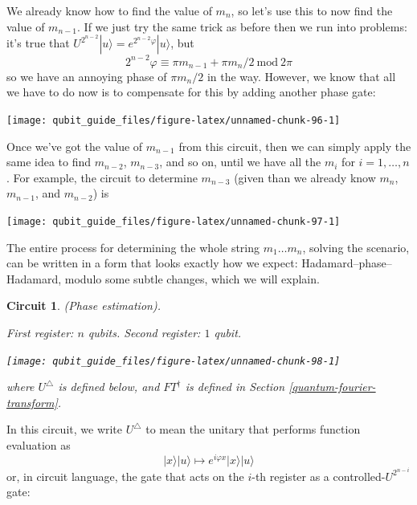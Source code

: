 \documentclass[fleqn,a4paper]{article}
\newtheorem*{circuit}{Circuit}
\theoremstyle{definition}
\theoremstyle{definition}
\theoremstyle{definition}
\theoremstyle{definition}
\theoremstyle{remark}
\begin{document}
We already know how to find the value of \(m_n\), so let's use this to now find the value of \(m_{n-1}\).
If we just try the same trick as before then we run into problems: it's true that \(U^{2^{n-2}}|u\rangle=e^{2^{n-2}\varphi}|u\rangle\), but
\[
  2^{n-2}\varphi
  \equiv \pi m_{n-1}+\pi m_n/2 \ \mathrm{mod}\ 2\pi
\]
so we have an annoying phase of \(\pi m_n/2\) in the way.
However, we know that all we have to do now is to compensate for this by adding another phase gate:

\begin{center}\texttt{[image: qubit\_guide\_files/figure-latex/unnamed-chunk-96-1]} \end{center}

Once we've got the value of \(m_{n-1}\) from this circuit, then we can simply apply the same idea to find \(m_{n-2}\), \(m_{n-3}\), and so on, until we have all the \(m_i\) for \(i=1,\ldots,n\).
For example, the circuit to determine \(m_{n-3}\) (given than we already know \(m_n\), \(m_{n-1}\), and \(m_{n-2}\)) is

\begin{center}\texttt{[image: qubit\_guide\_files/figure-latex/unnamed-chunk-97-1]} \end{center}

The entire process for determining the whole string \(m_1\ldots m_n\), solving the scenario, can be written in a form that looks exactly how we expect: Hadamard--phase--Hadamard, modulo some subtle changes, which we will explain.

\begin{circuit}

\emph{(Phase estimation).}

First register: \(n\) qubits. Second register: \(1\) qubit.

\begin{center}\texttt{[image: qubit\_guide\_files/figure-latex/unnamed-chunk-98-1]} \end{center}

where \(U^\triangle\) is defined below, and \(FT^\dagger\) is defined in Section \ref{quantum-fourier-transform}.

\end{circuit}

In this circuit, we write \(U^\triangle\) to mean the unitary that performs function evaluation as
\[
  |x\rangle|u\rangle
  \longmapsto e^{i\varphi x}|x\rangle|u\rangle
\]
or, in circuit language, the gate that acts on the \(i\)-th register as a controlled-\(U^{2^{n-i}}\) gate:
\end{document}
